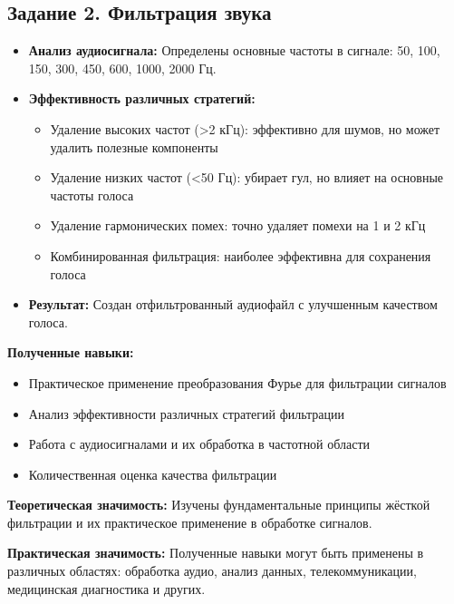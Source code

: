 \subsection*{Задание 2. Фильтрация звука}

\begin{itemize}
    \item \textbf{Анализ аудиосигнала:} Определены основные частоты в сигнале: 50, 100, 150, 300, 450, 600, 1000, 2000 Гц.
    
    \item \textbf{Эффективность различных стратегий:}
    \begin{itemize}
        \item Удаление высоких частот (>2 кГц): эффективно для шумов, но может удалить полезные компоненты
        \item Удаление низких частот (<50 Гц): убирает гул, но влияет на основные частоты голоса
        \item Удаление гармонических помех: точно удаляет помехи на 1 и 2 кГц
        \item Комбинированная фильтрация: наиболее эффективна для сохранения голоса
    \end{itemize}
    
    \item \textbf{Результат:} Создан отфильтрованный аудиофайл с улучшенным качеством голоса.
\end{itemize}

\textbf{Полученные навыки:}
\begin{itemize}
    \item Практическое применение преобразования Фурье для фильтрации сигналов
    \item Анализ эффективности различных стратегий фильтрации
    \item Работа с аудиосигналами и их обработка в частотной области
    \item Количественная оценка качества фильтрации
\end{itemize}

\textbf{Теоретическая значимость:} Изучены фундаментальные принципы жёсткой фильтрации и их практическое применение в обработке сигналов.

\textbf{Практическая значимость:} Полученные навыки могут быть применены в различных областях: обработка аудио, анализ данных, телекоммуникации, медицинская диагностика и других.
